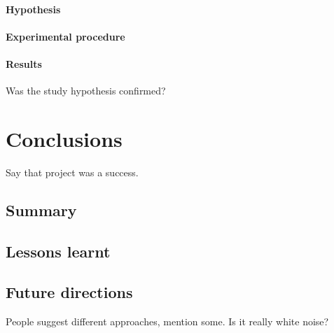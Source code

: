 \documentclass[12pt,british,twoside,notitlepage,usenames,dvipsnames,hypens,final]{report}
\numberwithin{equation}{section}
\numberwithin{figure}{section}
\begin{document}
\subsubsection{Hypothesis}

\subsubsection{Experimental procedure}

\subsubsection{Results}

Was the study hypothesis confirmed?

\cleardoublepage
\chapter{Conclusions}

Say that project was a success.

\section{Summary}

\section{Lessons learnt}

\section{Future directions}

People suggest different approaches, mention some. Is it really white noise?

\cleardoublepage


\end{document}
